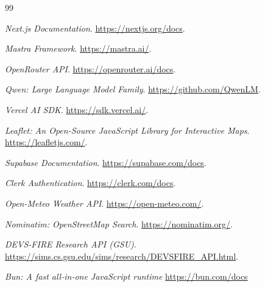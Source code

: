\documentclass[12pt]{article}
\begin{document}
\newpage
\begin{thebibliography}{99}

  \textit{Next.js Documentation}.
  \url{https://nextjs.org/docs}.

  \textit{Mastra Framework}.
  \url{https://mastra.ai/}.

  \textit{OpenRouter API}.
  \url{https://openrouter.ai/docs}.

  \textit{Qwen: Large Language Model Family}.
  \url{https://github.com/QwenLM}.

  \textit{Vercel AI SDK}.
  \url{https://sdk.vercel.ai/}.

  \textit{Leaflet: An Open-Source JavaScript Library for Interactive Maps}.
  \url{https://leafletjs.com/}.

  \textit{Supabase Documentation}.
  \url{https://supabase.com/docs}.

  \textit{Clerk Authentication}.
  \url{https://clerk.com/docs}.

  \textit{Open-Meteo Weather API}.
  \url{https://open-meteo.com/}.

  \textit{Nominatim: OpenStreetMap Search}.
  \url{https://nominatim.org/}.

  \textit{DEVS-FIRE Research API (GSU)}.
  \url{https://sims.cs.gsu.edu/sims/research/DEVSFIRE_API.html}.

\textit{Bun: A fast all-in-one JavaScript runtime}
\url{https://bun.com/docs}

\end{thebibliography}
\end{document}

